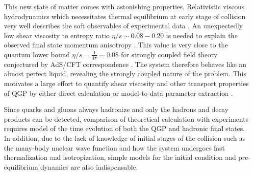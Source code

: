 \documentclass[aps,prl,twocolumn,groupedaddress]{revtex4-1}
\begin{document}
	This new state of matter comes with astonishing properties.
	Relativistic viscous hydrodynamics which necessitates thermal equilibrium at early stage of collision very well describes the soft observables of experimental data \cite{Heinz:2013th}.
	An unexpectedly low shear viscosity to entropy ratio $\eta/s \sim 0.08 - 0.20$ is needed to explain the observed final state momentum anisotropy \cite{Song:2010mg}. This value is very close to the quantum lower bound $\eta/s = \frac{1}{4\pi} \sim 0.08$ for strongly coupled field theory conjectured by AdS/CFT correspondence \citep{Kovtun:2004de}. 
	The system therefore behaves like an almost perfect liquid, revealing the strongly coupled nature of the problem.
	This motivates a large effort to quantify shear viscosity and other transport properties of QGP by either direct calculation or model-to-data parameter extraction \citep{Shen:2015msa}.  
	
	Since quarks and gluons always hadronize and only the hadrons and decay products can be detected, comparison of theoretical calculation with experiments requires model of the time evolution of both the QGP and hadronic final states.
	In addition, due to the lack of knowledge of initial stages of the collision such as the many-body nuclear wave function and how the system undergoes fast thermalization and isotropization, simple models for the initial condition and pre-equilibrium dynamics are also indispensable.
	
\end{document}
